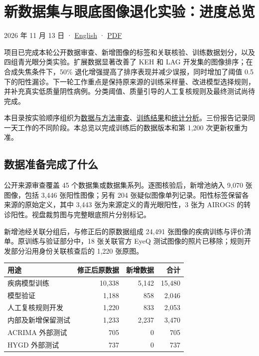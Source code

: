 \documentclass[
  10pt,
]{article}
\author{}
\date{}
\newcounter{none} %
\begin{document}
\section{新数据集与眼底图像退化实验：进度总览}\label{ux65b0ux6570ux636eux96c6ux4e0eux773cux5e95ux56feux50cfux9000ux5316ux5b9eux9a8cux8fdbux5ea6ux603bux89c8}

2026 年 11 月 13 日 · \href{progress-overview.en.md}{English} ·
\href{progress-overview.zh.pdf}{PDF}

项目已完成本轮公开数据审查、新增图像的标签和关联核验、训练数据划分，以及四组青光眼分类实验。扩展数据显著改善了
KEH 和 LAG 开发集的图像排序；在合成失焦条件下，50\%
退化增强提高了排序表现并减少误报，同时增加了阈值 0.5
下的阳性漏诊。下一轮工作重点是保持原来源的训练采样量、改进模型选择规则，并补充真实低质量阴性病例。分类阈值、质量引导的人工复核规则及最终测试尚待完成。

本目录按实验顺序组织为\href{data-review/data-and-degradation-review.zh.md}{数据与方法审查}、\href{training-results/training-results.zh.md}{训练结果}和\href{experimental-analysis/experimental-analysis.zh.md}{统计分析}。三份报告记录同一天工作的不同阶段。本总览以完成训练后的数据版本和第
1,200 次更新权重为准。

\subsection{数据准备完成了什么}\label{ux6570ux636eux51c6ux5907ux5b8cux6210ux4e86ux4ec0ux4e48}

公开来源审查覆盖 45 个数据集或数据集系列。逐图核验后，新增池纳入 9,070
张图像，包括 3,446 张阳性图像；另有 204
张疑似图像单列记录。阳性标签保留各来源的原始定义，其中 3,443
张为来源定义的青光眼阳性，3 张为 AIROGS
的转诊阳性。视盘裁剪图与完整眼底照片分别标记。

新增池经关联分组后，与修正后的原数据组成 24,491
张图像的疾病训练与评价清单。原训练与验证部分中，18 张关联官方 EyeQ
测试图像的照片已移除；规则开发部分沿用身份关联核查后的 1,220 张原图。

{\def\LTcaptype{none} %
\begin{longtable}[]{@{}lrrr@{}}
\toprule\noalign{}
用途 & 修正后原数据 & 新增数据 & 合计 \\
\midrule\noalign{}
\endhead
\bottomrule\noalign{}
\endlastfoot
疾病模型训练 & 10,338 & 5,142 & 15,480 \\
模型验证 & 1,188 & 858 & 2,046 \\
人工复核规则开发 & 1,220 & 833 & 2,053 \\
内部及新增保留测试 & 1,233 & 2,237 & 3,470 \\
ACRIMA 外部测试 & 705 & 0 & 705 \\
HYGD 外部测试 & 737 & 0 & 737 \\
\end{longtable}
}
\end{document}
